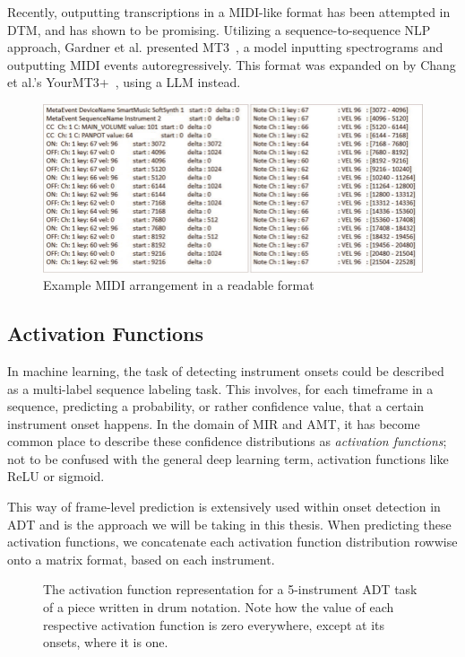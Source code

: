 Recently, outputting transcriptions in a \gls{MIDI}-like format has been attempted in \gls{DTM}, and has shown to be promising. Utilizing a sequence-to-sequence \gls{NLP} approach, Gardner et al. presented MT3~\cite{gardner2022mt3multitaskmultitrackmusic}, a model inputting spectrograms and outputting \gls{MIDI} events autoregressively. This format was expanded on by Chang et al.'s YourMT3+~\cite{chang2024yourmt3+}, using a \gls{LLM} instead.

\begin{figure}[H]
    \centering
    \includegraphics[scale=0.6, trim={0 0 13.8cm 0},clip]{figures/midi}
    \caption{Example MIDI arrangement in a readable format}
    \label{MIDIFigure}
\end{figure}

\subsection{Activation Functions}

In machine learning, the task of detecting instrument onsets could be described as a multi-label sequence labeling task. This involves, for each timeframe in a sequence, predicting a probability, or rather confidence value, that a certain instrument onset happens. In the domain of \gls{MIR} and \gls{AMT}, it has become common place to describe these confidence distributions as \textit{activation functions}; not to be confused with the general deep learning term, activation functions like ReLU or sigmoid.~\cite{8350302, Southall2016AutomaticDT, vogl2018multiinstrumentdrumtranscription}

This way of frame-level prediction is extensively used within onset detection in \gls{ADT} and is the approach we will be taking in this thesis. When predicting these activation functions, we concatenate each activation function distribution rowwise onto a matrix format, based on each instrument.

\begin{figure}[H]
    \centering
    \hspace*{-0.5cm}
    
    \caption{The activation function representation for a 5-instrument \gls{ADT} task of a piece written in drum notation. Note how the value of each respective activation function is zero everywhere, except at its onsets, where it is one.}
    \label{ActivationsFigure}
\end{figure}

